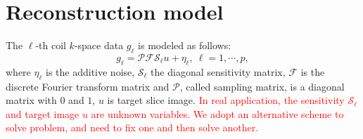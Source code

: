 \documentclass[preprint]{elsarticle}
\newcommand{\tr}[1]{\textcolor{red}{#1}}
\begin{document}
	\section{Reconstruction model} 
	The $\ell$-th  coil $k$-space data $g_\ell$  is modeled as follows:
	\begin{equation*}\label{eq:SENSE-ObsModel}
		g_\ell = \mathcal{P}\mathcal{F}\mathcal{S}_\ell u + \eta_\ell,\: \ell =1,\cdots, p,
	\end{equation*}
	where $\eta_\ell$ is the additive noise, $\mathcal{S}_\ell$ the diagonal sensitivity matrix, $\mathcal{F}$ is the discrete Fourier transform matrix  and
	$\mathcal{P}$, called sampling matrix,  is a diagonal matrix with $0$ and $1$, $u$ is target slice image.
	\tr{In real application, the sensitivity $\mathcal{S}_\ell$  and target image $u$ are unknown variables. We adopt an alternative scheme to solve problem, and need to fix one and then solve another.}
	
\end{document}
